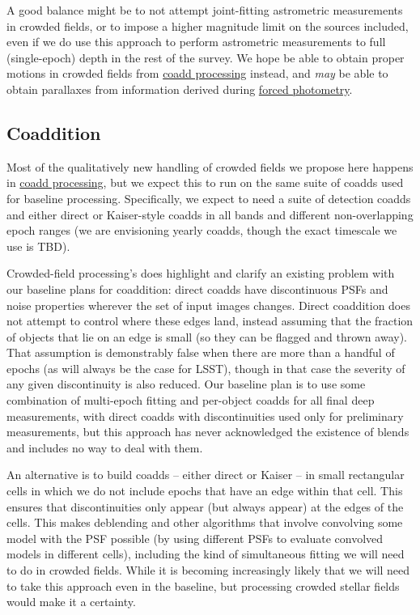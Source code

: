\documentclass[DM,authoryear,toc]{lsstdoc}
\begin{document}
A good balance might be to not attempt joint-fitting astrometric measurements in crowded fields, or to impose a higher magnitude limit on the sources included, even if we do use this approach to perform astrometric measurements to full (single-epoch) depth in the rest of the survey.
We hope be able to obtain proper motions in crowded fields from \hyperref[sec:coadd-processing]{coadd processing} instead, and \emph{may} be able to obtain parallaxes from information derived during \hyperref[sec:forced-photometry]{forced photometry}.

\subsection{Coaddition}
\label{sec:coaddition}

Most of the qualitatively new handling of crowded fields we propose here happens in \hyperref[sec:coadd-processing]{coadd processing}, but we expect this to run on the same suite of coadds used for baseline processing.
Specifically, we expect to need a suite of detection coadds and either direct or Kaiser-style coadds in all bands and different non-overlapping epoch ranges (we are envisioning yearly coadds, though the exact timescale we use is TBD).

Crowded-field processing's does highlight and clarify an existing problem with our baseline plans for coaddition: direct coadds have discontinuous PSFs and noise properties wherever the set of input images changes.
Direct coaddition does not attempt to control where these edges land, instead assuming that the fraction of objects that lie on an edge is small (so they can be flagged and thrown away).
That assumption is demonstrably false when there are more than a handful of epochs (as will always be the case for LSST), though in that case the severity of any given discontinuity is also reduced.
Our baseline plan is to use some combination of multi-epoch fitting and per-object coadds for all final deep measurements, with direct coadds with discontinuities used only for preliminary measurements, but this approach has never acknowledged the existence of blends and includes no way to deal with them.

An alternative is to build coadds -- either direct or Kaiser -- in small rectangular cells in which we do not include epochs that have an edge within that cell.
This ensures that discontinuities only appear (but always appear) at the edges of the cells.
This makes deblending and other algorithms that involve convolving some model with the PSF possible (by using different PSFs to evaluate convolved models in different cells), including the kind of simultaneous fitting we will need to do in crowded fields.
While it is becoming increasingly likely that we will need to take this approach even in the baseline, but processing crowded stellar fields would make it a certainty.
\end{document}
